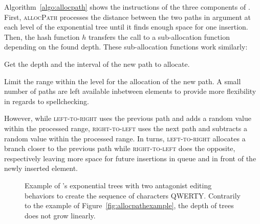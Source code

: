 Algorithm~\ref{algo:allocpath} shows the instructions of the three components of
\LSEQ. First, \textsc{allocPath} processes the distance between the two paths in
argument at each level of the exponential tree until it finds enough space for
one insertion.  Then, the hash function $h$ transfers the call to a
sub-allocation function depending on the found depth. These sub-allocation
functions work similarly:
\begin{inparaenum}[(i)]
\item Get the depth and the interval of the new path to allocate.
\item Limit the range within the level for the allocation of the new path. A
  small number of paths are left available inbetween elements to provide more
  flexibility in regards to spellchecking.
\item However, while \textsc{left-to-right} uses the previous path and adds a
  random value within the processed range, \textsc{right-to-left} uses the next
  path and subtracts a random value within the processed range. In turns,
  \textsc{left-to-right} allocates a branch closer to the previous path while
  \textsc{right-to-left} does the opposite, respectively leaving more space for
  future insertions in queue and in front of the newly inserted element.
\end{inparaenum}

\begin{figure}
  \centering
  \caption{\label{fig:lseqtreeexample} Example of \LSEQ's exponential trees with
    two antagonist editing behaviors to create the sequence of characters
    QWERTY. Contrarily to the example of Figure~\ref{fig:allocpathexample}, the
    depth of trees does not grow linearly.}
\end{figure}


